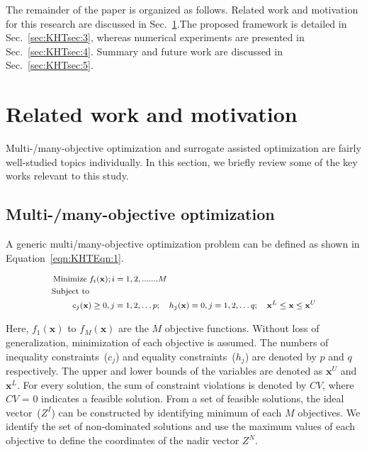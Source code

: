 The remainder of the paper is organized as follows. Related work and motivation for this research are discussed in Sec.~\ref{sec:KHTsec:2}.The proposed framework is detailed in Sec.~\ref{sec:KHTsec:3}, whereas numerical experiments are presented in Sec.~\ref{sec:KHTsec:4}. Summary and future work are discussed in Sec.~\ref{sec:KHTsec:5}.

\vspace{-1em}
\section{Related work and motivation}
\label{sec:KHTsec:2}

Multi-/many-objective optimization and surrogate assisted optimization are fairly well-studied topics individually. In this section, we briefly review some of the key works relevant to this study. 
\vspace{-1em}
\subsection{Multi-/many-objective optimization}

A generic multi/many-objective optimization problem can be defined as shown in Equation~\ref{eqn:KHTEqn:1}.

\begin{equation}\footnotesize
\begin{aligned}
\operatorname{Minimize}\; & f_i(\textbf{x}); i=1,2,.......M \\
\text{Subject to} & \\
& \hspace{-0.6cm}c_j(\textbf{x})\ge 0, j=1,2,\ldots p ; \quad h_j(\textbf{x}) = 0, j=1,2,\ldots q;  \quad \textbf{x}^{L}\le\textbf{x}\le\textbf{x}^{U}\\ 
\label{eqn:KHTEqn:1}
\end{aligned}
\end{equation}

\noindent Here, $f_1(\textbf{x})$  to $f_M(\textbf{x})$ are the $M$ objective functions. Without loss of generalization, minimization of each objective is assumed. The numbers of inequality constraints~($c_j$) and equality constraints~($h_j$) are denoted by $p$ and $q$ respectively. The upper and lower bounds of the variables are denoted as $\textbf{x}^{U}$ and $\textbf{x}^{L}$. For every solution, the sum of constraint violations is denoted by $CV$, where $CV$ = $0$ indicates a feasible solution. From a set of feasible solutions, the ideal vector~($Z^I$) can be constructed by identifying minimum of each $M$ objectives. We identify the set of non-dominated solutions and use the maximum values of each objective to define the coordinates of the nadir vector $Z^N$.

